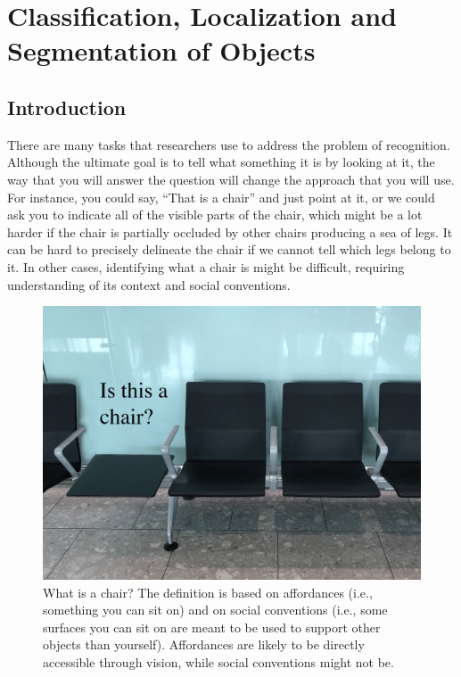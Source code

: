 

\chapter{Classification, Localization and Segmentation of Objects}
\label{chapter:object_recognition}





\section{Introduction}

There are many tasks that researchers use to address  the problem of recognition. Although  the ultimate goal is to tell what something it is by looking at it, the way that you will answer the question will change the approach that you will use. For instance, you could say, ``That is a chair'' and just point at it, or we could ask you to indicate all of the visible parts of the chair, which might be a lot harder if the chair is partially occluded by other chairs producing a sea of legs. It can be hard to precisely delineate the chair if we cannot tell which legs belong to it. In other cases, identifying what a chair is might be difficult, requiring understanding of its context and social conventions.  

  
\begin{figure}[h]
\centerline{
\includegraphics[width=0.7\linewidth]{figures/object_recognition/what_is_a_chair_with_text.jpg}
}
\caption{What is a chair? The definition is based on affordances (i.e., something you can sit on) and on social conventions (i.e., some surfaces you can sit on are meant to be used to support other objects than yourself). Affordances are likely to be directly accessible through vision, while social conventions might not be.}
\end{figure}

